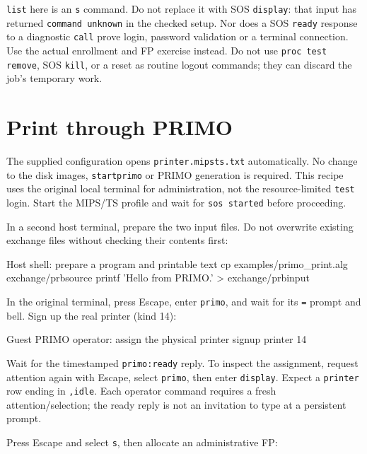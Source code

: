 \texttt{list} here is an \texttt{s} command. Do not replace it with SOS
\texttt{display}: that input has returned \texttt{command unknown} in the
checked setup. Nor does a SOS \texttt{ready} response to a diagnostic
\texttt{call} prove login, password validation or a terminal connection.
Use the actual enrollment and FP exercise instead. Do not use \texttt{proc
test remove}, SOS \texttt{kill}, or a reset as routine logout commands;
they can discard the job's temporary work.

\section{Print through PRIMO}\label{mips-ts-primo-printing}

The supplied configuration opens \texttt{printer.mipsts.txt} automatically.
No change to the disk images, \texttt{startprimo} or PRIMO generation is
required. This recipe uses the original local terminal for administration,
not the resource-limited \texttt{test} login. Start the MIPS/TS profile and
wait for \texttt{sos started} before proceeding.

In a second host terminal, prepare the two input files. Do not overwrite
existing exchange files without checking their contents first:

\begin{commandexample}{Host shell: prepare a program and printable text}
cp examples/primo_print.alg exchange/prbsource
printf 'Hello from PRIMO.\n' > exchange/prbinput
\end{commandexample}

In the original terminal, press Escape, enter \texttt{primo}, and wait for
its \texttt{=} prompt and bell. Sign up the real printer (kind 14):

\begin{commandexample}{Guest PRIMO operator: assign the physical printer}
signup printer 14
\end{commandexample}

Wait for the timestamped \texttt{primo:ready} reply. To inspect the
assignment, request attention again with Escape, select \texttt{primo},
then enter \texttt{display}. Expect a \texttt{printer} row ending in
\texttt{,idle}. Each operator command requires a fresh attention/selection;
the ready reply is not an invitation to type at a persistent prompt.

Press Escape and select \texttt{s}, then allocate an administrative FP:

